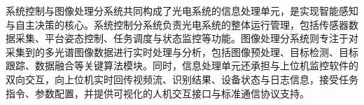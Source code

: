 系统控制与图像处理分系统共同构成了光电系统的信息处理单元，是实现智能感知与自主决策的核心。系统控制分系统负责光电系统的整体运行管理，包括传感器数据采集、平台姿态控制、任务调度与状态监控等功能。图像处理分系统则专注于对采集到的多光谱图像数据进行实时处理与分析，包括图像预处理、目标检测、目标跟踪、数据融合等关键算法模块。同时，信息处理单元还承担与上位机监控软件的双向交互，向上位机实时回传视频流、识别结果、设备状态与日志信息，接受任务指令、参数配置，并提供可视化的人机交互接口与标准通信协议支持。






